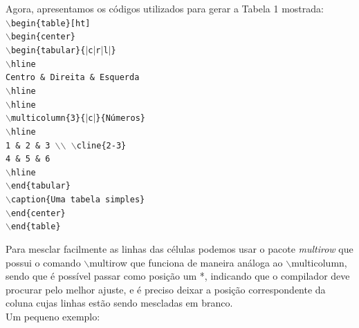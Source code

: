 \documentclass[12pt]{article}
\begin{document}
		
		
					Agora, apresentamos os códigos utilizados para gerar a Tabela 1 mostrada:\\
					\texttt{$\backslash$begin\{{table}\}[ht]\\}
					\texttt{$\backslash$begin\{{center}\}\\}
					\texttt{$\backslash$begin\{{tabular}\}{\{$|$c$|$r$|$l$|$}\}\\}
					\texttt{$\backslash$hline\\}
					\texttt{Centro \& Direita \& Esquerda \\}
					\texttt{$\backslash$hline \\}
					\texttt{$\backslash$hline\\}
					\texttt{$\backslash$multicolumn\{{3}\}{\{$|$c$|$}\}{\{Números}\}\\}
					\texttt{$\backslash$hline \\}
					\texttt{1 \& 2 \& 3 $\backslash$$\backslash$ $\backslash$cline\{{2-3}\}\\
						4 \& 5 \& 6 \\}
					\texttt{$\backslash$hline \\}
					\texttt{$\backslash$end\{{tabular}\}\\}
					\texttt{$\backslash$caption\{{Uma tabela simples}\}\\}
					\texttt{$\backslash$end\{{center}\}\\}
					\texttt{$\backslash$end\{{table}\}\\}
		
					Para mesclar facilmente as linhas das células podemos usar o pacote
					\textit{multirow} que possui o comando $\backslash$multirow que funciona de maneira análoga
					ao $\backslash$multicolumn, sendo que é possível passar como posição um *, indicando
					que o compilador deve procurar pelo melhor ajuste, e é preciso deixar a posição correspondente da coluna cujas linhas estão sendo mescladas em branco.\\
					Um pequeno exemplo:\\
		
\end{document}
